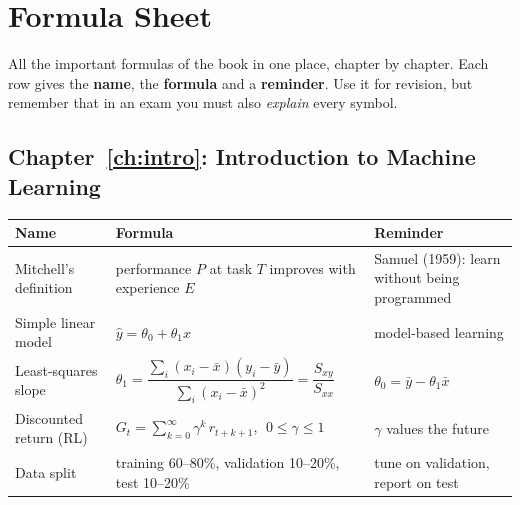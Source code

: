 \chapter{Formula Sheet}\label{app:formulas}

All the important formulas of the book in one place, chapter by chapter. Each row gives the \textbf{name}, the \textbf{formula} and a \textbf{reminder}. Use it for revision, but remember that in an exam you must also \emph{explain} every symbol.

\newcommand{\ftab}[1]{\begin{center}\small\renewcommand{\arraystretch}{1.5}\begin{tabular}{@{}p{3.5cm}p{7.9cm}p{3.1cm}@{}}\toprule\textbf{Name} & \textbf{Formula} & \textbf{Reminder}\\\midrule #1 \\\bottomrule\end{tabular}\end{center}}

\section*{Chapter~\ref{ch:intro}: Introduction to Machine Learning}
\ftab{
Mitchell's definition & performance $P$ at task $T$ improves with experience $E$ & Samuel (1959): learn without being programmed\\
Simple linear model & $\hat y=\theta_0+\theta_1x$ & model-based learning\\
Least-squares slope & $\theta_1=\dfrac{\sum_i(x_i-\bar x)(y_i-\bar y)}{\sum_i(x_i-\bar x)^2}=\dfrac{S_{xy}}{S_{xx}}$ & $\theta_0=\bar y-\theta_1\bar x$\\
Discounted return (RL) & $G_t=\sum_{k=0}^{\infty}\gamma^{k}\,r_{t+k+1}$, $\;0\le\gamma\le1$ & $\gamma$ values the future\\
Data split & training 60--80\%, validation 10--20\%, test 10--20\% & tune on validation, report on test
}

